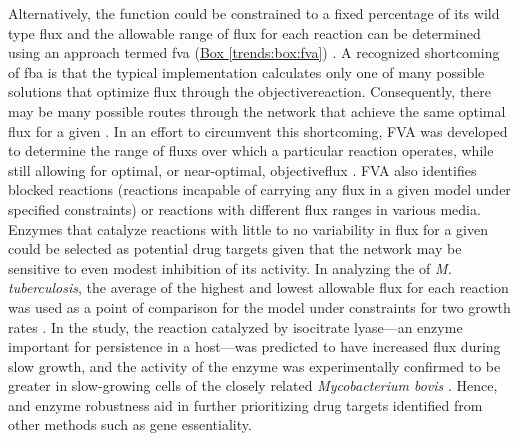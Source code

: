 Alternatively, the  function could be constrained to a fixed 
percentage of its wild type \gls{flux} and the allowable range of \gls{flux} 
for each reaction can be determined using an approach termed 
\gls{fva} (\hyperref[trends:box:fva]{Box \ref{trends:box:fva}}) \cite{Mahadevan:2003di}. A recognized shortcoming 
of \gls{fba} is that the typical implementation calculates only one 
of many possible solutions that optimize \gls{flux} through the 
\gls{objectivereaction}. Consequently, there may be many possible routes through 
the network that achieve the same optimal \gls{flux} for a given 
 \cite{Price:2004hx,Mahadevan:2003di}. 
In an effort to circumvent this shortcoming, 
FVA was developed to determine the range of \glspl{flux} over which 
a particular reaction operates, while still allowing for 
optimal, or near-optimal, \gls{objectiveflux} \cite{Mahadevan:2003di}. FVA also identifies 
blocked reactions (reactions incapable of carrying any \gls{flux} in 
a given model under specified constraints) or reactions with 
different \gls{flux} ranges in various media. Enzymes that catalyze 
reactions with little to no variability in \gls{flux} for a given 
 could be selected as potential drug targets given that 
the network may be sensitive to even modest inhibition of its 
activity. In analyzing the  of \textit{M. tuberculosis}, the 
average of the highest and lowest allowable \gls{flux} for each reaction 
was used as a point of comparison for the model under constraints 
for two growth rates \cite{Beste:2007bi}. In the study, the reaction catalyzed by 
isocitrate lyase---an enzyme important for persistence in a 
host---was predicted to have increased \gls{flux} during slow growth, 
and the activity of the enzyme was experimentally confirmed to 
be greater in slow-growing cells of the closely related 
\textit{Mycobacterium bovis} \cite{Beste:2007bi}. Hence,  and enzyme 
robustness aid in further prioritizing drug targets identified 
from other methods such as gene essentiality.



